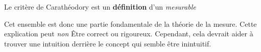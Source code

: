 \documentclass[a4paper]{article}
\begin{document}
Le critère de Carathéodory est un
\textbf{définition}%
 d'un %
\textit{mesurable}%

Cet ensemble est donc une partie fondamentale de la théorie de la mesure. Cette explication peut
\textit{non}%
 Être correct ou rigoureux. Cependant, cela devrait aider à trouver une intuition derrière le concept qui semble être inintuitif.

\end{document}
